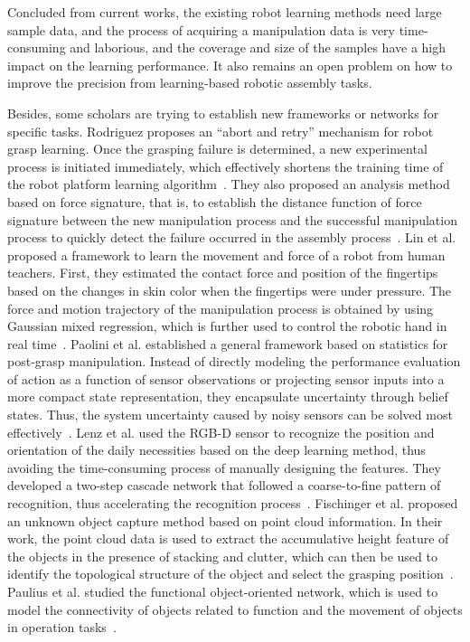 \documentclass[journal,twoside,web]{ieeecolor}
\begin{document}
Concluded from current works, the existing robot learning methods need large sample data, and the process of acquiring a manipulation data is very time-consuming and laborious, and the coverage and size of the samples have a high impact on the learning performance. 
It also remains an open problem on how to improve the precision from learning-based robotic assembly tasks.

Besides, some scholars are trying to establish new frameworks or networks for specific tasks. 
Rodriguez proposes an “abort and retry” mechanism for robot grasp learning. Once the grasping failure is determined, a new experimental process is initiated immediately, which effectively shortens the training time of the robot platform learning algorithm~\cite{Rodriguez2011}. 
They also proposed an analysis method based on force signature, that is, to establish the distance function of force signature between the new manipulation process and the successful manipulation process to quickly detect the failure occurred in the assembly process~\cite{Rodriguez2010}.
Lin et al. proposed a framework to learn the movement and force of a robot from human teachers. First, they estimated the contact force and position of the fingertips based on the changes in skin color when the fingertips were under pressure. The force and motion trajectory of the manipulation process is obtained by using Gaussian mixed regression, which is further used to control the robotic hand in real time~\cite{Lin2012}.
Paolini et al. established a general framework based on statistics for post-grasp manipulation. Instead of directly modeling the performance evaluation of action as a function of sensor observations or projecting sensor inputs into a more compact state representation, they encapsulate uncertainty through belief states. Thus, the system uncertainty caused by noisy sensors can be solved most effectively~\cite{Paolini2014}. 
Lenz et al. used the RGB-D sensor to recognize the position and orientation of the daily necessities based on the deep learning method, thus avoiding the time-consuming process of manually designing the features. They developed a two-step cascade network that followed a coarse-to-fine pattern of recognition, thus accelerating the recognition process~\cite{Lenz2015}.
Fischinger et al. proposed an unknown object capture method based on point cloud information. In their work, the point cloud data is used to extract the accumulative height feature of the objects in the presence of stacking and clutter, which can then be used to identify the topological structure of the object and select the grasping position~\cite{Fischinger2015}. 
Paulius et al. studied the functional object-oriented network, which is used to model the connectivity of objects related to function and the movement of objects in operation tasks~\cite{Paulius2016}. 
\end{document}
